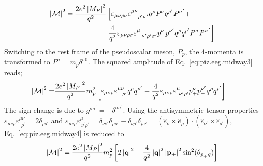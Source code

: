 \begin{align} \label{eq:piz.eeg.midway3}
\left|{\cal M}\right|^{2} = \frac{2e^{2}\left|M_{P}\right|^{2}}{q^{2}}
& \left[\varepsilon_{\mu\nu\rho\sigma}\varepsilon^{\mu\nu}_{\quad \rho^{\prime}\sigma^{\prime}}q^{\rho}P^{\sigma}q^{\rho^{\prime}}P^{\sigma^{\prime}} +
\right. \nonumber \\ & \left. \frac{4}{q^2} \varepsilon_{\mu\nu\rho\sigma}\varepsilon^{\mu}_{\ \ \nu^{\prime} \rho^{\prime}\sigma^{\prime}} p_{+}^{\nu}p_{+}^{\nu^{\prime}}q^{\rho}q^{\rho^{\prime}}P^{\sigma}P^{\sigma^{\prime}}\right]
\end{align}
Switching to the rest frame of the pseudoscalar meson, $P_p$, the 4-momenta is transformed to $P^\sigma = m_p\delta^{\sigma 0}$. The squared amplitude of Eq.~\ref{eq:piz.eeg.midway3} reads;
\begin{align} \label{eq:piz.eeg.midway4}
\left|{\cal M}\right|^{2} = & \frac{2e^{2}\left|M_{P}\right|^{2}}{q^{2}}m_p^2
\left[\varepsilon_{\mu\nu\rho}\varepsilon^{\mu\nu}_{\ \ \rho^{\prime}}q^{\rho}q^{\rho^{\prime}} - \frac{4}{q^2} \varepsilon_{\mu\nu\rho}\varepsilon^{\mu}_{\ \nu^{\prime}\rho^{\prime}} p_{+}^{\nu}p_{+}^{\nu^{\prime}}q^{\rho}q^{\rho^{\prime}}\right]
\end{align}
The sign change is due to $g^{\sigma \sigma^{\prime}} = -\delta^{\sigma \sigma^{\prime}}$. 
Using the antisymmetric tensor properties $\varepsilon_{\mu\nu\rho}\varepsilon^{\mu\nu}_{\ \ \rho^{\prime}} = 2\delta_{\rho\rho^{\prime}}$ and $\varepsilon_{\mu\nu\rho}\varepsilon^{\mu}_{\ \nu^{\prime}\rho^{\prime}} = \delta_{\nu\nu^{\prime}}\delta_{\rho\rho^{\prime}} - \delta_{\nu\rho^{\prime}}\delta_{\rho\nu^{\prime}} = (\hat{e}_{\nu} \times \hat{e}_{\rho}) \cdot (\hat{e}_{\nu^{\prime}} \times \hat{e}_{\rho^{\prime}})$, Eq.~\ref{eq:piz.eeg.midway4} is reduced to 
\begin{align} \label{eq:piz.eeg.final}
\left|{\cal M}\right|^{2} =  \frac{2e^{2}\left|M_{P}\right|^{2}}{q^{2}}m_p^2
\left[2\left|\bf{q}\right|^2 - \frac{4}{q^2} \left|\bf{q}\right|^2 \left|\bf{p_{+}}\right|^2 \sin^2(\theta_{p_{_+}q}) \right]
\end{align}


